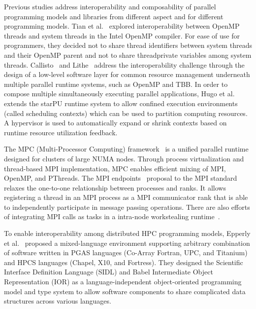 Previous studies address interoperability and composability of parallel programming models and libraries 
from different aspect and for different programming models. 
Tian et al.~\cite{tian2003compiler} explored interoperability between OpenMP threads and system threads in the Intel OpenMP compiler.
For ease of use for programmers, they decided not to share thread identifiers between system threads and their OpenMP parent
and not to share {\sf threadprivate} variables among system threads.
Callisto~\cite{Callisto:Harris:2014:CCP:2592798.2592807} and
Lithe~\cite{Lithe:Pan:2009:LEE:1855591.1855602} 
address the interoperability challenge 
through the design of a low-level software layer for common 
resource management underneath multiple parallel runtime systems, such as OpenMP and TBB. %
In order to compose multiple simultaneously executing parallel applications, Hugo et al.~\cite{hugo2014composing} extends the starPU runtime system to allow confined execution environments (called scheduling contexts) which can be used to partition computing resources. 
A hypervisor is used to automatically expand or shrink contexts based on runtime resource utilization feedback. 

The MPC (Multi-Processor Computing) framework~\cite{perache2008mpc} is a unified parallel runtime designed for clusters of large NUMA nodes. 
Through process virtualization and thread-based MPI implementation, MPC enables efficient mixing of MPI, OpenMP, and PThreads. 
The MPI endpoints~\cite{Dinan:mpiendpoint_eurompi13}
proposal to the MPI standard relaxes the one-to-one relationship between processes and ranks.
It allows registering a thread in an MPI
process as a MPI communicator rank that is able to independently participate
in message passing operations. There are also efforts of integrating MPI calls as
tasks in a intra-node workstealing runtime~\cite{hcmpi:ipdps13}.

To enable interoperability among distributed HPC programming models, Epperly et al.~\cite{epperly2011composite} proposed a mixed-language environment supporting arbitrary combination of software written in PGAS languages (Co-Array Fortran, UPC, and Titanium) and HPCS languages (Chapel, X10, and Fortress). 
They designed the Scientific Interface Definition Language (SIDL) and Babel Intermediate Object Representation (IOR) as a language-independent object-oriented programming model and type system
to allow software components to share complicated data structures across various languages. 
